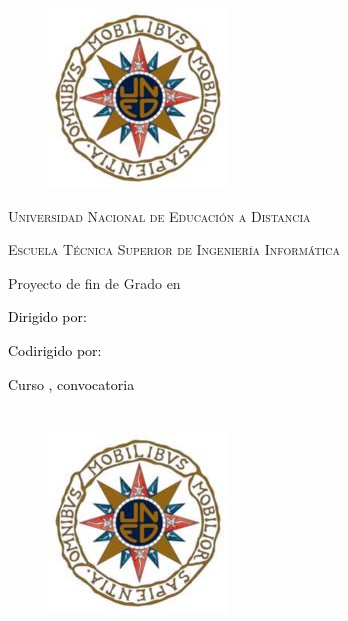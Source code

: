 \documentclass[12pt]{book}
\begin{document}

\begin{titlepage}

\begin{figure}[!htb]
    \centering
    \includegraphics{rosadelosvientos.png}
\end{figure}

\begin{center}
    {\scshape\Large Universidad Nacional de Educación a Distancia \par}
    {\scshape\Large Escuela Técnica Superior de Ingeniería Informática \par}
    \vfill
    \large{Proyecto de fin de Grado en \PFGgrado}\\
    \vfill
    {\bfseries\Huge \textcolor{black}{\PFGtitulo} \par}
    \vfill
\end{center}

\vspace*{3cm}
{\huge \textcolor{black}{\PFGautor} \par}
{\huge \textcolor{black}{Dirigido por: \PFGdirector} \par}
\ifdefined\PFGcodirector
  \huge \textcolor{black}{Codirigido por: \PFGcodirector} \par
\fi
{\huge \textcolor{black}{Curso \PFGcursoacademico, convocatoria \PFGconvocatoria} \par}

\chapter*{}

\thispagestyle{empty}

\begin{figure}[!htb]
    \centering
    \includegraphics{rosadelosvientos.png}
\end{figure}


\end{titlepage}
\end{document}
